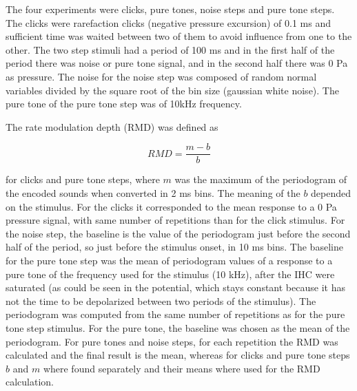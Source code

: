 The four experiments were clicks, pure tones, noise steps and pure tone steps.
The clicks were rarefaction clicks (negative pressure excursion) of 0.1 ms and sufficient time was waited between 
two of them to avoid influence from one to the other.
The two step stimuli had a period of 100 ms and in the first half of the period 
there was noise or pure tone signal, and in the second half there was 0 Pa as pressure.
The noise for the noise step was composed of random normal variables divided 
by the square root of the bin size (gaussian white noise).
The pure tone of the pure tone step was of 10kHz frequency.

The rate modulation depth (RMD) was defined as 

\begin{equation}\label{rmdformula1} RMD =  \frac{m - b}{b}\end{equation}

%
%
for clicks and pure tone steps,
where $m$ was 
the maximum of the periodogram of the encoded sounds when converted in 2 ms bins.
The meaning of the $b$ depended on the stimulus. 
For the clicks it corresponded to the mean response to a 0 Pa pressure signal,
 with same number of repetitions than for the click stimulus. 
For the noise step, the baseline is the value of the periodogram just before the second 
half of the period, so just before the stimulus onset,
 in 10 ms bins. 
The baseline for the pure tone step was the mean of periodogram values
of a response to a pure tone of the frequency used for the stimulus (10 kHz),
after the IHC were saturated (as could be seen in the potential, 
which stays constant because it has not the time 
to be depolarized between two periods of the stimulus). 
The periodogram was computed from the same number of repetitions as for the pure tone step stimulus.
For the pure tone, the baseline was chosen as the mean of the periodogram.
For pure tones and noise steps, for each repetition the RMD was calculated and the final result is the mean, whereas
for clicks and pure tone steps $b$ and $m$ where found separately and their means where used for the RMD calculation.

